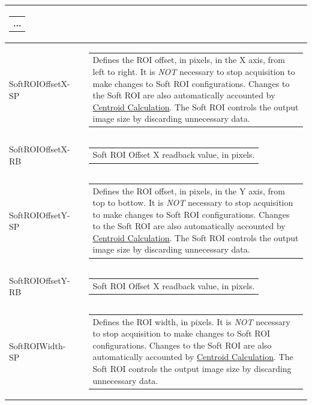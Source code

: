 \documentclass[openany]{article}
\begin{document}
\begin{longtable}{| m{3.0cm} m{4.5cm} m{7.0cm} |}
\begin{tabular}{@{}m{6cm}@{}}
                ...
            \end{tabular} \hypertarget{pv:soft-roi-off-x}{}\\ \hline
        SoftROIOffsetX-SP &  & \begin{tabular}{@{}m{6cm}@{}}
                Defines the ROI offset, in pixels, in the X axis, from left to right.
                It is \emph{NOT} necessary to stop acquisition to make changes to Soft ROI 
                configurations. Changes to the Soft ROI are also automatically accounted by
                \hyperref[sec:centroid-calc]{Centroid Calculation}.
                The Soft ROI controls the output image size by discarding unnecessary data.
            \end{tabular} \\ \hline
        SoftROIOffsetX-RB &  & \begin{tabular}{@{}m{6cm}@{}}
                Soft ROI Offset X readback value, in pixels.
            \end{tabular} \hypertarget{pv:soft-roi-off-y}{}\\ \hline
        SoftROIOffsetY-SP &  & \begin{tabular}{@{}m{6cm}@{}}
                Defines the ROI offset, in pixels, in the Y axis, from top to bottow.
                It is \emph{NOT} necessary to stop acquisition to make changes to Soft ROI 
                configurations. Changes to the Soft ROI are also automatically accounted by
                \hyperref[sec:centroid-calc]{Centroid Calculation}.
                The Soft ROI controls the output image size by discarding unnecessary data.
            \end{tabular} \\ \hline
        SoftROIOffsetY-RB &  & \begin{tabular}{@{}m{6cm}@{}}
                Soft ROI Offset X readback value, in pixels.
            \end{tabular} \hypertarget{pv:soft-roi-width}{}\\ \hline
        SoftROIWidth-SP &  & \begin{tabular}{@{}m{6cm}@{}}
                Defines the ROI width, in pixels. It is \emph{NOT} necessary to stop
                acquisition to make changes to Soft ROI configurations. Changes to the
                Soft ROI are also automatically accounted by 
                \hyperref[sec:centroid-calc]{Centroid Calculation}.
                The Soft ROI controls the output image size by discarding unnecessary data.

\end{tabular}
\end{longtable}
\end{document}
